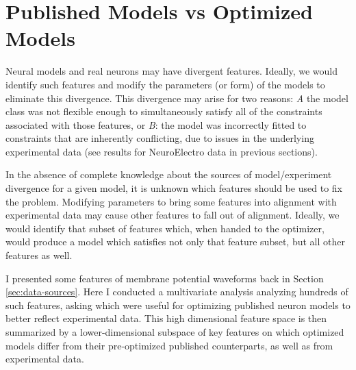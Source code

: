 

\section{Published Models vs Optimized Models}
\label{sec:optimizing-published-models}
Neural models and real neurons may have divergent features.
Ideally, we would identify such features and modify the parameters (or form) of the models to eliminate this divergence.
This divergence may arise for two reasons: \emph{A} the model class was not flexible enough to simultaneously satisfy all of the constraints associated with those features, or \emph{B}: the model was incorrectly fitted to constraints that are inherently conflicting, due to issues in the underlying experimental data (see results for NeuroElectro data in previous sections).

In the absence of complete knowledge about the sources of model/experiment divergence for a given model, it is unknown which features should be used to fix the problem.
Modifying parameters to bring some features into alignment with experimental data may cause other features to fall out of alignment.
Ideally, we would identify that subset of features which, when handed to the optimizer, would produce a model which satisfies not only that feature subset, but all other features as well. 

I presented some features of membrane potential waveforms back in Section  \ref{sec:data-sources}.
Here I conducted a multivariate analysis analyzing hundreds of such features, asking which were useful for optimizing published neuron models to better reflect experimental data.
This high dimensional feature space is then summarized by a lower-dimensional subspace of key features on which optimized models differ from their pre-optimized published counterparts, as well as from experimental data.


